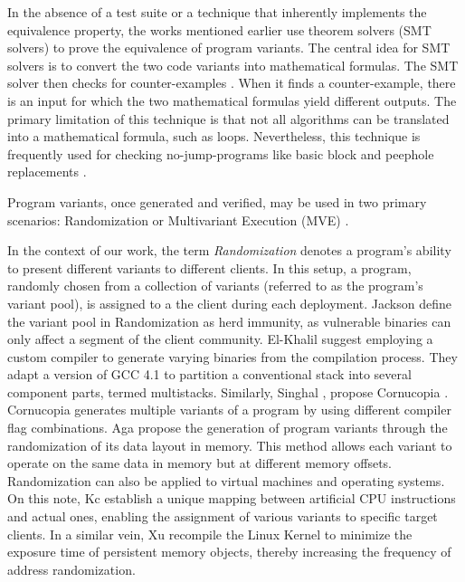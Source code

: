 \begin{checking}
    \label{check_by_smt}
    In the absence of a test suite or a technique that inherently implements the equivalence property, the works mentioned earlier use theorem solvers (SMT solvers) \cite{SMT_solver} to prove the equivalence of program variants. 
    The central idea for SMT solvers is to convert the two code variants into mathematical formulas. 
    The SMT solver then checks for counter-examples \cite{kesseli2018counterexample}. 
    When it finds a counter-example, there is an input for which the two mathematical formulas yield different outputs. 
    The primary limitation of this technique is that not all algorithms can be translated into a mathematical formula, such as loops. 
    Nevertheless, this technique is frequently used for checking no-jump-programs like basic block and peephole replacements \cite{SuperoptimizationScaling}.
\end{checking}



\label{deployment}
Program variants, once generated and verified, may be used in two primary scenarios: Randomization or Multivariant Execution (MVE) \cite{jackson}. 


\begin{strategy}[Randomization]
    \label{randomization}
    In the context of our work, the term \emph{Randomization} denotes a program's ability to present different variants to different clients. 
    In this setup, a program, randomly chosen from a collection of variants (referred to as the program's variant pool), is assigned to a the client during each deployment. 
    Jackson \etal \cite{jackson} define the variant pool in Randomization as herd immunity, as vulnerable binaries can only affect a segment of the client community. 
    El-Khalil \etal \cite{ElKhalil2004} suggest employing a custom compiler to generate varying binaries from the compilation process. 
    They adapt a version of GCC 4.1 to partition a conventional stack into several component parts, termed multistacks. 
    Similarly, Singhal \etal, propose Cornucopia \cite{cornucopia}.
    Cornucopia generates multiple variants of a program by using different compiler flag combinations.
    Aga \etal propose the generation of program variants through the randomization of its data layout in memory\cite{aga2019smokestack}. 
    This method allows each variant to operate on the same data in memory but at different memory offsets. 
    Randomization can also be applied to virtual machines and operating systems. On this note, Kc \etal \cite{Kc03} establish a unique mapping between artificial CPU instructions and actual ones, enabling the assignment of various variants to specific target clients. 
    In a similar vein, Xu \etal \cite{xu2020merr} recompile the Linux Kernel to minimize the exposure time of persistent memory objects, thereby increasing the frequency of address randomization.
\end{strategy}


